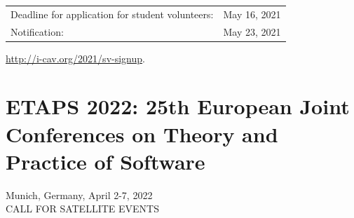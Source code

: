 \documentclass[prodmode,acmtecs]{acmsmall} %
\begin{document}
\begin{itemize}
\begin{tabulary}{\linewidth}{LL}Deadline for application for student volunteers:  & May 16, 2021 \\
Notification:  & May 23, 2021 \\
\end{tabulary}
 
  \href{http://i-cav.org/2021/sv-signup}{http://i-cav.org/2021/sv-signup}.  
 
\end{itemize}\section{ETAPS 2022: 25th European Joint Conferences on Theory and Practice of Software }\label{ETAPS2022}  Munich, Germany, April 2-7, 2022\\ 
CALL FOR SATELLITE EVENTS 
\end{document}
